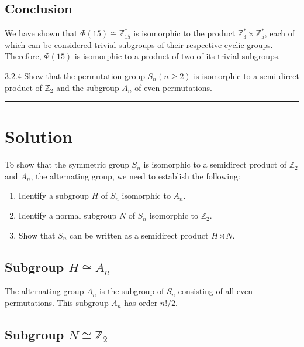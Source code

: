 \documentclass[12pt]{amsart}
\theoremstyle{definition}
\numberwithin{equation}{section}
\newcommand{\Z}{\mathbb{Z}}
\begin{document}
\begin{exercise}{3}
    \subsection*{Conclusion}

    We have shown that \(\Phi(15) \cong \Z_{15}^*\) is isomorphic to the product \(\Z_3^* \times \Z_5^*\), each of which can be considered trivial subgroups of their respective cyclic groups. Therefore, \(\Phi(15)\) is isomorphic to a product of two of its trivial subgroups.

\end{exercise}
\newpage

\begin{exercise}{3.2.4} Show that the permutation group \(S_n(n \geq 2)\) is isomorphic to a semi-direct product of \(\Z_2\) and the subgroup \(A_n\) of even permutations. 

    \noindent\rule{\linewidth}{1pt}
    
    \section*{Solution}

    To show that the symmetric group \(S_n\) is isomorphic to a semidirect product of \(\Z_2\) and \(A_n\), the alternating group, we need to establish the following:
    \begin{enumerate}
        \item Identify a subgroup \(H\) of \(S_n\) isomorphic to \(A_n\).
        \item Identify a normal subgroup \(N\) of \(S_n\) isomorphic to \(\Z_2\).
        \item Show that \(S_n\) can be written as a semidirect product \(H \rtimes N\).
    \end{enumerate}

    \subsection*{Subgroup \(H \cong A_n\)}

    The alternating group \(A_n\) is the subgroup of \(S_n\) consisting of all even permutations. This subgroup \(A_n\) has order \(n!/2\).

    \subsection*{Subgroup \(N \cong \Z_2\)}


\end{exercise}
\end{document}
